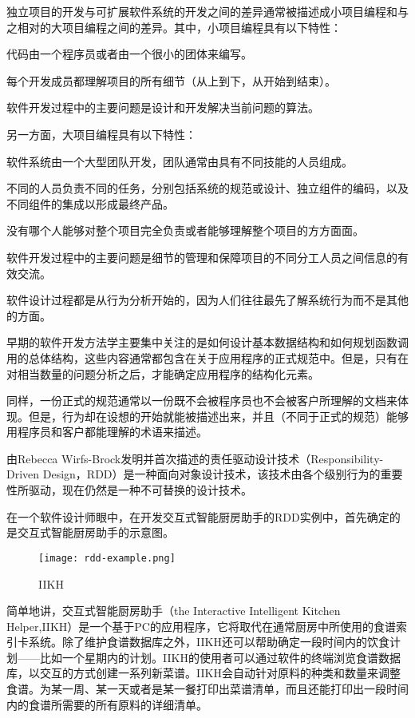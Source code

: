 独立项目的开发与可扩展软件系统的开发之间的差异通常被描述成小项目编程和与之相对的大项目编程之间的差异。其中，小项目编程具有以下特性：

\begin{compactenum}
\item 代码由一个程序员或者由一个很小的团体来编写。
\item 每个开发成员都理解项目的所有细节（从上到下，从开始到结束）。
\item 软件开发过程中的主要问题是设计和开发解决当前问题的算法。
\end{compactenum}

另一方面，大项目编程具有以下特性：

\begin{compactenum}
\item 软件系统由一个大型团队开发，团队通常由具有不同技能的人员组成。
\item 不同的人员负责不同的任务，分别包括系统的规范或设计、独立组件的编码，以及不同组件的集成以形成最终产品。
\item 没有哪个人能够对整个项目完全负责或者能够理解整个项目的方方面面。
\item 软件开发过程中的主要问题是细节的管理和保障项目的不同分工人员之间信息的有效交流。
\end{compactenum}

软件设计过程都是从行为分析开始的，因为人们往往最先了解系统行为而不是其他的方面。

早期的软件开发方法学主要集中关注的是如何设计基本数据结构和如何规划函数调用的总体结构，这些内容通常都包含在关于应用程序的正式规范中。但是，只有在对相当数量的问题分析之后，才能确定应用程序的结构化元素。

同样，一份正式的规范通常以一份既不会被程序员也不会被客户所理解的文档来体现。但是，行为却在设想的开始就能被描述出来，并且（不同于正式的规范）能够用程序员和客户都能理解的术语来描述。

由Rebecca Wirfs-Brock发明并首次描述的责任驱动设计技术（Responsibility-Driven Design，RDD）是一种面向对象设计技术，该技术由各个级别行为的重要性所驱动，现在仍然是一种不可替换的设计技术。


在一个软件设计师眼中，在开发交互式智能厨房助手的RDD实例中，首先确定的是交互式智能厨房助手的示意图。

\begin{figure}[htbp]
\centering
\texttt{[image: rdd-example.png]}
\caption{IIKH}
\label{fig:iikh}
\end{figure}


简单地讲，交互式智能厨房助手（the Interactive Intelligent Kitchen Helper,IIKH）是一个基于PC的应用程序，它将取代在通常厨房中所使用的食谱索引卡系统。除了维护食谱数据库之外，IIKH还可以帮助确定一段时间内的饮食计划——比如一个星期内的计划。IIKH的使用者可以通过软件的终端浏览食谱数据库，以交互的方式创建一系列新菜谱。IIKH会自动针对原料的种类和数量来调整食谱。为某一周、某一天或者是某一餐打印出菜谱清单，而且还能打印出一段时间内的食谱所需要的所有原料的详细清单。


